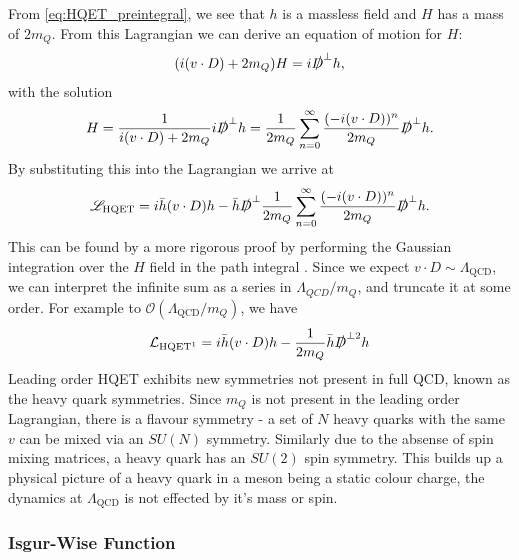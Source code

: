 From \eqref{eq:HQET_preintegral}, we see that $h$ is a massless field and $H$ has a mass of $2m_Q$. From this Lagrangian we can derive an equation of motion for $H$:
\begin{align}
	( i(v\cdot D) + 2m_Q) H = i\slashed{D}^{\perp} h,
\end{align}
with the solution
\begin{align}
	H = {1\over i(v\cdot D) + 2m_Q} i\slashed{D}^{\perp} h = {1\over 2m_Q}\sum_{n=0}^{\infty} {(-i(v\cdot D))^n\over 2m_Q} \slashed{D}^{\perp} h.
\end{align}
By substituting this into the Lagrangian we arrive at
\begin{align}
	\mathscr{L}_{\text{HQET}} = i \bar{h} (v\cdot D) h - \bar{h} \slashed{D}^{\perp} {1\over 2m_Q}\sum_{n=0}^{\infty} {(-i(v\cdot D))^n\over 2m_Q} \slashed{D}^{\perp} h.
\end{align}
This can be found by a more rigorous proof by performing the Gaussian integration over the $H$ field in the path integral {\color{red}{ref!}}. Since we expect $v\cdot D \sim \Lambda_{\text{QCD}}$, we can interpret the infinite sum as a series in $\Lambda_{QCD}/m_Q$, and truncate it at some order. For example to $\mathcal{O}(\Lambda_{\text{QCD}}/m_Q)$, we have
\begin{align}
	\mathcal{L}_{\text{HQET}^1} = i \bar{h} (v\cdot D) h - {1\over 2m_Q} \bar{h} \slashed{D}^{\perp 2} h
	\label{eq:HQET1}
\end{align}
 Leading order HQET exhibits new symmetries not present in full QCD, known as the heavy quark symmetries. Since $m_Q$ is not present in the leading order Lagrangian, there is a flavour symmetry - a set of $N$ heavy quarks with the same $v$ can be mixed via an $SU(N)$ symmetry. Similarly due to the absense of spin mixing matrices, a heavy quark has an $SU(2)$ spin symmetry. This builds up a physical picture of a heavy quark in a meson being a static colour charge, the dynamics at $\Lambda_{\text{QCD}}$ is not effected by it's mass or spin.

\subsubsection{Isgur-Wise Function}
\label{sec:isgurwise}

